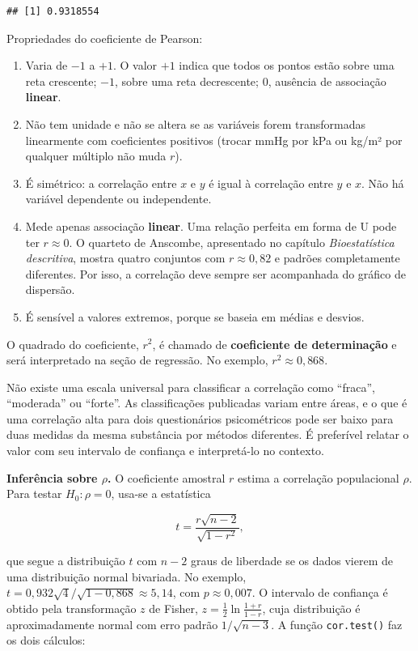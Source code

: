 \documentclass[
]{book}
\providecommand{\tightlist}{%
  \setlength{\itemsep}{0pt}\setlength{\parskip}{0pt}}
\begin{document}
\begin{verbatim}
## [1] 0.9318554
\end{verbatim}

Propriedades do coeficiente de Pearson:

\begin{enumerate}
\def\labelenumi{\arabic{enumi}.}
\tightlist
\item
  Varia de \(-1\) a \(+1\). O valor \(+1\) indica que todos os pontos estão sobre uma reta crescente; \(-1\), sobre uma reta decrescente; \(0\), ausência de associação \textbf{linear}.
\item
  Não tem unidade e não se altera se as variáveis forem transformadas linearmente com coeficientes positivos (trocar mmHg por kPa ou kg/m² por qualquer múltiplo não muda \(r\)).
\item
  É simétrico: a correlação entre \(x\) e \(y\) é igual à correlação entre \(y\) e \(x\). Não há variável dependente ou independente.
\item
  Mede apenas associação \textbf{linear}. Uma relação perfeita em forma de U pode ter \(r \approx 0\). O quarteto de Anscombe, apresentado no capítulo \emph{Bioestatística descritiva}, mostra quatro conjuntos com \(r \approx 0{,}82\) e padrões completamente diferentes. Por isso, a correlação deve sempre ser acompanhada do gráfico de dispersão.
\item
  É sensível a valores extremos, porque se baseia em médias e desvios.
\end{enumerate}

O quadrado do coeficiente, \(r^2\), é chamado de \textbf{coeficiente de determinação} e será interpretado na seção de regressão. No exemplo, \(r^2 \approx 0{,}868\).

Não existe uma escala universal para classificar a correlação como ``fraca'', ``moderada'' ou ``forte''. As classificações publicadas variam entre áreas, e o que é uma correlação alta para dois questionários psicométricos pode ser baixo para duas medidas da mesma substância por métodos diferentes. É preferível relatar o valor com seu intervalo de confiança e interpretá-lo no contexto.

\textbf{Inferência sobre \(\rho\).} O coeficiente amostral \(r\) estima a correlação populacional \(\rho\). Para testar \(H_0\colon \rho = 0\), usa-se a estatística

\[
t = \frac{r\sqrt{n - 2}}{\sqrt{1 - r^2}},
\]

que segue a distribuição \(t\) com \(n - 2\) graus de liberdade se os dados vierem de uma distribuição normal bivariada. No exemplo, \(t = 0{,}932\sqrt{4}/\sqrt{1 - 0{,}868} \approx 5{,}14\), com \(p \approx 0{,}007\). O intervalo de confiança é obtido pela transformação \(z\) de Fisher, \(z = \frac{1}{2}\ln\frac{1+r}{1-r}\), cuja distribuição é aproximadamente normal com erro padrão \(1/\sqrt{n - 3}\). A função \texttt{cor.test()} faz os dois cálculos:
\end{document}
